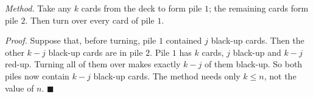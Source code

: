 \emph{Method.} Take any $k$ cards from the deck to form pile $1$; the remaining cards form pile $2$. Then turn over every card of pile $1$.

\emph{Proof.} Suppose that, before turning, pile $1$ contained $j$ black-up cards. Then the other $k-j$ black-up cards are in pile $2$. Pile $1$ has $k$ cards, $j$ black-up and $k-j$ red-up. Turning all of them over makes exactly $k-j$ of them black-up. So both piles now contain $\boxed{k-j}$ black-up cards. The method needs only $k\le n$, not the value of $n$. $\blacksquare$
